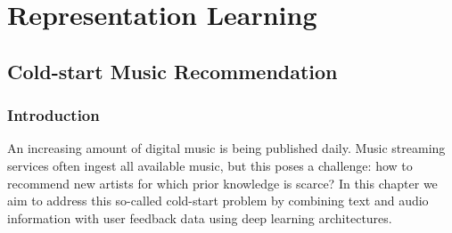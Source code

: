 
\part{Representation Learning}
\label{part:multimodal-deep}

\chapter{Cold-start Music Recommendation}
\label{sec:cold-rec}

\section{Introduction}\label{sec:cold-rec:intro}
\label{sec:cold-rec:intro}



An increasing amount of digital music is being published daily. Music streaming services often ingest all available music, but this poses a challenge: how to recommend new artists for which prior knowledge is scarce? In this chapter we aim to address this so-called cold-start problem by combining text and audio information with user feedback data using deep learning architectures. 


